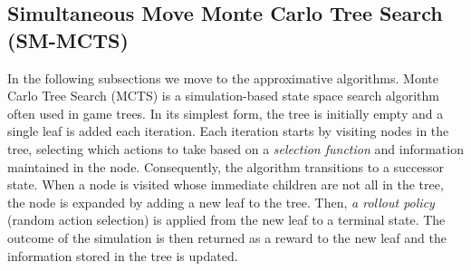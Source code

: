 \subsection{Simultaneous Move Monte Carlo Tree Search (SM-MCTS)} \label{sec:algs:smmcts}


In the following subsections we move to the approximative algorithms.
Monte Carlo Tree Search (MCTS) is a simulation-based state space search algorithm often used
in game trees. 
In its simplest form, the tree is initially empty and a single leaf is added each iteration. Each iteration
starts by visiting nodes in the tree, selecting which actions to take based on a \emph{selection function} and
information maintained in the node. Consequently, the algorithm transitions to a successor state. When a
node is visited whose immediate children are not all in the tree, the node is expanded by adding a
new leaf to the tree. Then, \emph{a rollout policy} (\eg random action selection) is applied from the new
leaf to a terminal state. The outcome of the simulation is then returned as a reward to the new leaf
and the information stored in the tree is updated.

